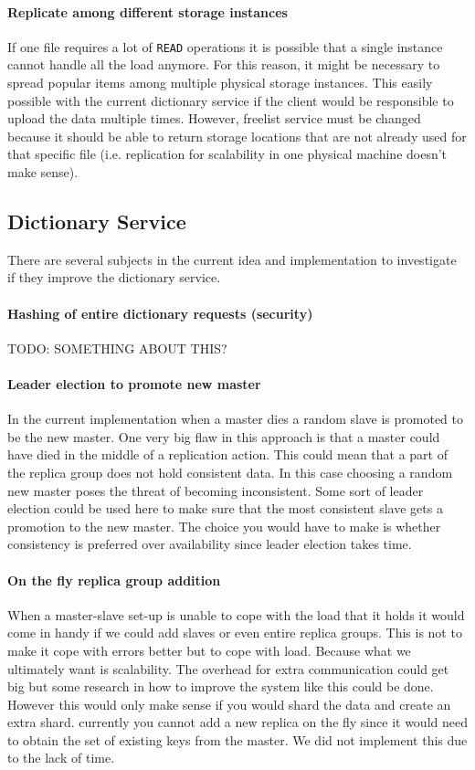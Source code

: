 \documentclass[12pt,a4paper]{scrartcl}
\begin{document}
\paragraph{Replicate among different storage instances}
If one file requires a lot of \verb|READ| operations it is possible that a single instance cannot handle all the load anymore. For this reason, it might be necessary to spread popular items among multiple physical storage instances. This easily possible with the current dictionary service if the client would be responsible to upload the data multiple times. However, freelist service must be changed because it should be able to return storage locations that are not already used for that specific file (i.e. replication for scalability in one physical machine doesn't make sense).

\subsection{Dictionary Service}
There are several subjects in the current idea and implementation to investigate if they improve the dictionary service.

\paragraph{Hashing of entire dictionary requests (security)}
TODO: SOMETHING ABOUT THIS?

\paragraph{Leader election to promote new master}
In the current implementation when a master dies a random slave is promoted to be the new master. One very big flaw in this approach is that a master could have died in the middle of a replication action. This could mean that a part of the replica group does not hold consistent data. In this case choosing a random new master poses the threat of becoming inconsistent. Some sort of leader election could be used here to make sure that the most consistent slave gets a promotion to the new master. The choice you would have to make is whether consistency is preferred over availability since leader election takes time.

\paragraph{On the fly replica group addition}
When a master-slave set-up is unable to cope with the load that it holds it would come in handy if we could add slaves or even entire replica groups. This is not to make it cope with errors better but to cope with load. Because what we ultimately want is scalability. The overhead for extra communication could get big but some research in how to improve the system like this could be done. However this would only make sense if you would shard the data and create an extra shard. currently you cannot add a new replica on the fly since it would need to obtain the set of existing keys from the master. We did not implement this due to the lack of time.
\end{document}
